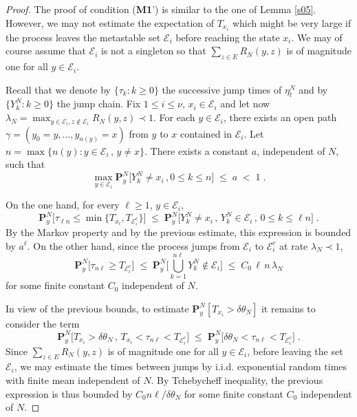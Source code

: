\documentclass[reqno]{amsart}
\begin{document}
\begin{proof}
The proof of condition ({\bf M1}') is similar to the one of Lemma
\ref{s05}. However, we may not estimate the expectation of $T_{x_i}$
which might be very large if the process leaves the metastable set
${{\mathcal E}}_i$ before reaching the state $x_i$. We may of course assume
that ${{\mathcal E}}_i$ is not a singleton so that $\sum_{z\in E} R_N(y,z)$ is
of magnitude one for all $y\in{{\mathcal E}}_i$.

Recall that we denote by $\{\tau_k : k\ge 0\}$ the successive jump
times of $\eta^N_t$ and by $\{Y^N_k : k\ge 0\}$ the jump chain.  Fix
$1\le i\le \nu$, $x_i\in {{\mathcal E}}_i$ and let now $\lambda_N = \max_{y\in
  {{\mathcal E}}_i, z\not \in {{\mathcal E}}_i} R_N(y,z) \prec 1$. For each $y\in {{\mathcal E}}_i$, there exists an open path $\gamma = (y_0=y, \dots, y_{n(y)}=x)$
from $y$ to $x$ contained in ${{\mathcal E}}_i$. Let $n= \max \{n(y) : y\in {{\mathcal E}}_i \,,\, y\not = x\}$. There exists a constant $a$, independent of
$N$, such that
\begin{equation*}
\max_{y\in {{\mathcal E}}_i}
{{\mathbf P}}^N_y \big[ Y^N_k \not = x_i \,, 0 \le k\le n \big] \;\le\; a\; <\;
1\; . 
\end{equation*}

On the one hand, for every $\ell\ge 1$, $y\in{{\mathcal E}}_i$,
\begin{equation*}
{{\mathbf P}}^N_y \big[ \tau_{\ell n} \le \min \{ T_{x_i}, T_{{{\mathcal E}}^c_i} \}
\big] \;\le\; 
{{\mathbf P}}^N_y \big[ Y^N_k \not = x_i \,,\, Y^N_k \in {{\mathcal E}}_i \,,\,
0 \le k\le \ell n \big]\;.
\end{equation*}
By the Markov property and by the previous estimate, this expression
is bounded by $a^\ell$.  On the other hand, since the process jumps
from ${{\mathcal E}}_i$ to ${{\mathcal E}}^c_i$ at rate $\lambda_N \prec 1$,
\begin{equation*}
{{\mathbf P}}^N_y \big[ \tau_{n\ell} \ge  T_{{{\mathcal E}}^c_i} \big] \;\le\;
{{\mathbf P}}^N_y \Big[ \bigcup_{k=1}^{n\ell} Y^N_k \not \in {{\mathcal E}}_i \Big]
\;\le\; C_0\, \ell \,n\, \lambda_N 
\end{equation*}
for some finite constant $C_0$ independent of $N$.

In view of the previous bounds, to estimate ${{\mathbf P}}^N_y [ T_{x_i} >
\delta \theta_N ]$ it remains to consider the term
\begin{equation*}
{{\mathbf P}}^N_y \big[ T_{x_i} > \delta \theta_N \,,\,
T_{x_i} < \tau_{n\ell} < T_{{{\mathcal E}}^c_i} \big] \;\le\;
{{\mathbf P}}^N_y \big[ \delta \theta_N  < \tau_{n\ell} 
< T_{{{\mathcal E}}^c_i} \big] \;.
\end{equation*}
Since $\sum_{z\in E} R_N(y,z)$ is of magnitude one for all $y\in{{\mathcal E}}_i$,
before leaving the set ${{\mathcal E}}_i$, we may estimate the times between
jumps by i.i.d. exponential random times with finite mean independent
of $N$. By Tchebycheff inequality, the previous expression is thus
bounded by $C_0 n\ell /\delta \theta_N$ for some finite constant $C_0$
independent of $N$.


\end{proof}
\end{document}
